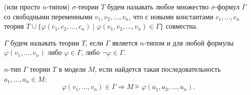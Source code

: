 
\begin{definition}
     (или просто $n$-типом) $\sigma$-теории $T$ будем называть любое
    множество $\sigma$-формул $\Gamma$ со свободными переменными $v_1, v_2, \dots, v_n$, что с новыми
    константами $c_1, \dots, c_n$ теория $T \cup \{\varphi(c_1, c_2, \dots, c_n) \mid \varphi(v_1, v_2,
    \dots, v_n) \in \Gamma\}$ совместна.
    
    $\Gamma$ будем называть  теории $T$, если $\Gamma$ является $n$-типом и для
    любой формулы $\varphi(v_1, \dots, v_n)$ либо $\varphi \in \Gamma$, либо $\neg \varphi \in \Gamma$.

    $n$-тип $\Gamma$ теории $T$  в модели $M$, если найдется такая
    последовательность $a_1, \dots, a_n \in M$:
    $$
        \varphi(v_1, \dots, v_n) \in \Gamma \Rightarrow M \models \varphi(a_1, a_2, \dots, a_n).
    $$
\end{definition}







